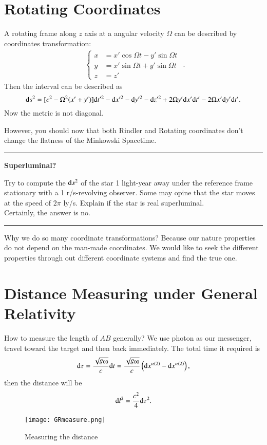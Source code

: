 \documentclass[openany,10pt]{book}
\theoremstyle{definition}
\theoremstyle{definition}
\theoremstyle{remark}
\begin{document}
\section{Rotating Coordinates}
A rotating frame along $z$ axis at a angular velocity $\Omega$ can be described by coordinates transformation:
\begin{equation}
    \begin{aligned}\begin{cases}
    x&=x'\cos{\Omega t}-y'\sin{\Omega t}\\
    y&=x'\sin{\Omega t}+y'\sin{\Omega t}\\
    z&=z'
    \end{cases}
    \end{aligned}.
\end{equation}
Then the interval can be described as
\begin{equation}
    {\rm d}s^2=[c^2-\Omega^2(x'+y')]{\rm d}t'^2-{\rm d}x'^2-{\rm d}y'^2-{\rm d}z'^2+2\Omega y'{\rm d}x'{\rm d}t'- 2\Omega x'{\rm d}y'{\rm d}t'.
\end{equation}
Now the metric is not diagonal.

However, you should now that  both Rindler and Rotating coordinates don't change the flatness of the Minkowski Spacetime.

\noindent\rule{\textwidth}{0.3mm}
\rem \textbf{Superluminal?}

Try to compute the ${\rm d}s^2$ of the star 1 light-year away under the reference frame stationary with a 1 r/s-revolving observer. Some may opine that the star moves at the speed of $2\pi$ ly/s. Explain if the star is real superluminal. \\
Certainly, the answer is no.

\noindent\rule{\textwidth}{0.3mm}

Why we do so many coordinate transformations? Because our nature properties do not depend on the man-made coordinates. We would like to seek the different properties through out different coordinate systems and find the true one.

\section{Distance Measuring under General Relativity}
How to measure the length of $AB$ generally?
We use photon as our messenger, travel toward the target and then back immediately. The total time it required is
\begin{equation}
    {\rm d}\tau=\frac{\sqrt{g_{00}}}{c}{\rm d}t=\frac{\sqrt{g_{00}}}{c}\left({\rm d}x^{\alpha(2)}-{\rm d}x^{\alpha(2)}\right),
\end{equation}
then the distance will be
\begin{equation}
    {\rm d}l^2=\frac{c^2}{4}{\rm d}\tau^2.
\end{equation}
\begin{figure}
    \centering
    \texttt{[image: GRmeasure.png]}
    \caption{Measuring the distance}
    \label{GRmeasure}
\end{figure}
\end{document}
